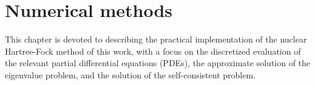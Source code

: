 \chapter{Numerical methods}
This chapter is devoted to describing the practical implementation of the nuclear Hartree-Fock method of this work, with a focus on the discretized evaluation of the relevant partial differential equations (PDEs), the approximate solution of the eigenvalue problem, and the solution of the self-consistent problem.


